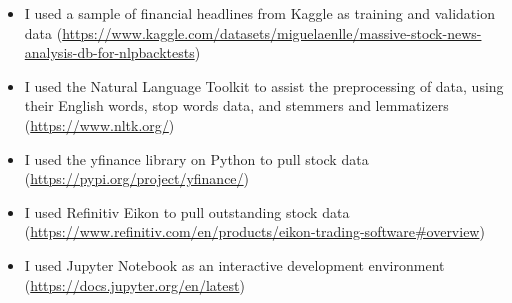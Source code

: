\documentclass[ oneside,%
                    author={Joshua Felmeden},
                    degree={MEng},
                     title={Sentiment Analysis of Financial Headlines Based on Realised Stock Returns},
                  subtitle={Research}]{dissertation}
\begin{document}


\begin{itemize}
      \item I used a sample of financial headlines from Kaggle as training and validation data (\url{https://www.kaggle.com/datasets/miguelaenlle/massive-stock-news-analysis-db-for-nlpbacktests})
      \item I used the Natural Language Toolkit to assist the preprocessing of data, using their English words, stop words data, and stemmers and lemmatizers (\url{https://www.nltk.org/})
      \item I used the yfinance library on Python to pull stock data (\url{https://pypi.org/project/yfinance/})
      \item I used Refinitiv Eikon to pull outstanding stock data (\url{https://www.refinitiv.com/en/products/eikon-trading-software#overview})
      \item I used Jupyter Notebook as an interactive development environment (\url{https://docs.jupyter.org/en/latest})
\end{itemize}
\end{document}
